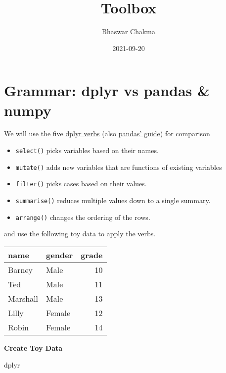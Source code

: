\documentclass[
]{book}
\title{Toolbox}
\author{Bhaswar Chakma}
\date{2021-09-20}
\begin{document}
\maketitle

{
\setcounter{tocdepth}{1}
\tableofcontents
}
\hypertarget{section}{%
\chapter*{}\label{section}}

\hypertarget{grammar-dplyr-vs-pandas-numpy}{%
\chapter{Grammar: dplyr vs pandas \& numpy}\label{grammar-dplyr-vs-pandas-numpy}}

We will use the five \href{https://dplyr.tidyverse.org/}{dplyr verbs} (also \href{https://pandas.pydata.org/pandas-docs/stable/getting_started/comparison/comparison_with_r.html}{pandas' guide}) for comparison

\begin{itemize}
\item
  \texttt{select()} picks variables based on their names.
\item
  \texttt{mutate()} adds new variables that are functions of existing variables
\item
  \texttt{filter()} picks cases based on their values.
\item
  \texttt{summarise()} reduces multiple values down to a single summary.
\item
  \texttt{arrange()} changes the ordering of the rows.
\end{itemize}

and use the following toy data to apply the verbs.

\begin{longtable}[]{@{}llr@{}}
\toprule
name & gender & grade \\
\midrule
\endhead
Barney & Male & 10 \\
Ted & Male & 11 \\
Marshall & Male & 13 \\
Lilly & Female & 12 \\
Robin & Female & 14 \\
\bottomrule
\end{longtable}

{\textbf{Create Toy Data}}

dplyr
\end{document}
